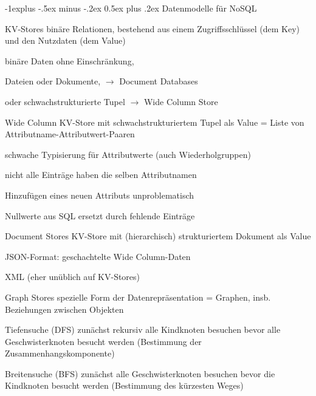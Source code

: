 \documentclass[a4paper]{article}
\makeatletter
\renewcommand{\subsection}{\@startsection{subsection}{2}{0mm}%
                                {-1explus -.5ex minus -.2ex}%
                                {0.5ex plus .2ex}%
                                {\normalfont\normalsize\bfseries}}
\makeatother
\begin{document}
\begin{multicols}{3}
    \subsection{Datenmodelle für NoSQL}
    \begin{description*}
        \item[KV-Stores] binäre Relationen, bestehend aus einem Zugriffsschlüssel (dem Key) und den Nutzdaten (dem Value)
        \begin{itemize*}
            \item binäre Daten ohne Einschränkung,
            \item Dateien oder Dokumente, $\rightarrow$ Document Databases
            \item oder schwachstrukturierte Tupel $\rightarrow$ Wide Column Store
        \end{itemize*}
        \item[Wide Column] KV-Store mit schwachstrukturiertem Tupel als Value = Liste von Attributname-Attributwert-Paaren
        \begin{itemize*}
            \item schwache Typisierung für Attributwerte (auch Wiederholgruppen)
            \item nicht alle Einträge haben die selben Attributnamen
            \item Hinzufügen eines neuen Attributs unproblematisch
            \item Nullwerte aus SQL ersetzt durch fehlende Einträge
        \end{itemize*}
        \item[Document Stores] KV-Store mit (hierarchisch) strukturiertem Dokument als Value
        \begin{itemize*}
            \item JSON-Format: geschachtelte Wide Column-Daten
            \item XML (eher unüblich auf KV-Stores)
        \end{itemize*}
        \item[Graph Stores] spezielle Form der Datenrepräsentation = Graphen, insb. Beziehungen zwischen Objekten
        \begin{description*}
            \item[Tiefensuche (DFS)] zunächst rekursiv alle Kindknoten besuchen bevor alle Geschwisterknoten besucht werden (Bestimmung der Zusammenhangskomponente)
            \item[Breitensuche (BFS)] zunächst alle Geschwisterknoten besuchen bevor die Kindknoten besucht werden (Bestimmung des kürzesten Weges)

\end{description*}
\end{description*}
\end{multicols}
\end{document}
